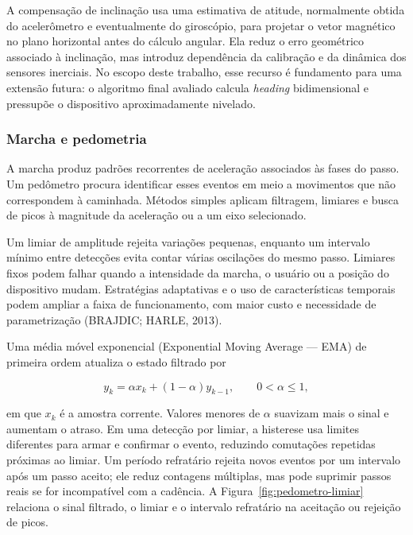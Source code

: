 \documentclass[a4paper,12pt]{article}
\begin{document}
A compensa\c{c}\~ao de inclina\c{c}\~ao usa uma estimativa de atitude, normalmente obtida do aceler\^ometro e eventualmente do girosc\'opio, para projetar o vetor magn\'etico no plano horizontal antes do c\'alculo angular. Ela reduz o erro geom\'etrico associado \`a inclina\c{c}\~ao, mas introduz depend\^encia da calibra\c{c}\~ao e da din\^amica dos sensores inerciais. No escopo deste trabalho, esse recurso \'e fundamento para uma extens\~ao futura: o algoritmo final avaliado calcula \emph{heading} bidimensional e pressup\~oe o dispositivo aproximadamente nivelado.


\subsubsection{Marcha e pedometria}


A marcha produz padr\~oes recorrentes de acelera\c{c}\~ao associados \`as fases do passo. Um ped\^ometro procura identificar esses eventos em meio a movimentos que n\~ao correspondem \`a caminhada. M\'etodos simples aplicam filtragem, limiares e busca de picos \`a magnitude da acelera\c{c}\~ao ou a um eixo selecionado.


Um limiar de amplitude rejeita varia\c{c}\~oes pequenas, enquanto um intervalo m\'inimo entre detec\c{c}\~oes evita contar v\'arias oscila\c{c}\~oes do mesmo passo. Limiares fixos podem falhar quando a intensidade da marcha, o usu\'ario ou a posi\c{c}\~ao do dispositivo mudam. Estrat\'egias adaptativas e o uso de caracter\'isticas temporais podem ampliar a faixa de funcionamento, com maior custo e necessidade de parametriza\c{c}\~ao (BRAJDIC; HARLE, 2013).


Uma m\'edia m\'ovel exponencial (Exponential Moving Average --- EMA) de primeira ordem atualiza o estado filtrado por


\[
y_k=\alpha x_k+(1-\alpha)y_{k-1}, \qquad 0<\alpha\leq 1,
\]


em que \(x_k\) \'e a amostra corrente. Valores menores de \(\alpha\) suavizam mais o sinal e aumentam o atraso. Em uma detec\c{c}\~ao por limiar, a histerese usa limites diferentes para armar e confirmar o evento, reduzindo comuta\c{c}\~oes repetidas pr\'oximas ao limiar. Um per\'iodo refrat\'ario rejeita novos eventos por um intervalo ap\'os um passo aceito; ele reduz contagens m\'ultiplas, mas pode suprimir passos reais se for incompat\'ivel com a cad\^encia. A Figura~\ref{fig:pedometro-limiar} relaciona o sinal filtrado, o limiar e o intervalo refrat\'ario na aceita\c{c}\~ao ou rejei\c{c}\~ao de picos.
\end{document}
